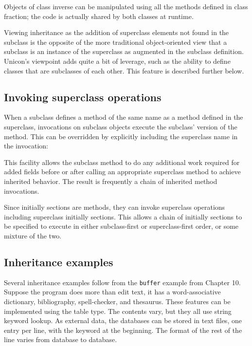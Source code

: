 
Objects of class inverse can be manipulated using all the methods
defined in class fraction; the code is actually shared by both classes
at runtime.

Viewing inheritance as the addition of superclass elements not found in
the subclass is the opposite of the more traditional object-oriented
view that a subclass is an instance of the
superclass as augmented in the subclass definition.
Unicon's viewpoint adds quite a bit of leverage, such
as the ability to define classes that are subclasses of each other.
This feature is described further below.

\subsection*{Invoking superclass operations}

When a subclass defines a
method of the same name as a method defined in the superclass,
invocations on subclass objects execute the
subclass' version of the
method. This can be overridden by explicitly
including the superclass name in the invocation:


This facility allows the subclass method to do any additional work
required for added fields before or after calling an appropriate
superclass method to achieve inherited behavior. The result is
frequently a chain of inherited method invocations.

Since initially sections are methods, they can invoke superclass
operations including superclass initially sections. This allows a chain
of initially sections to be specified to execute in either
subclass-first or superclass-first order, or some mixture of the two.

\subsection*{Inheritance examples}

Several inheritance examples follow from the \texttt{buffer}
example from Chapter 10. Suppose the program does more than
edit text, it has a word-associative
dictionary, bibliography, spell-checker, and thesaurus. These
features can be implemented using the table type.
The contents vary, but they all use string
keyword lookup. As external data, the databases can be stored in text
files, one entry per line, with the keyword at the beginning. The
format of the rest of the line varies from database to database.

